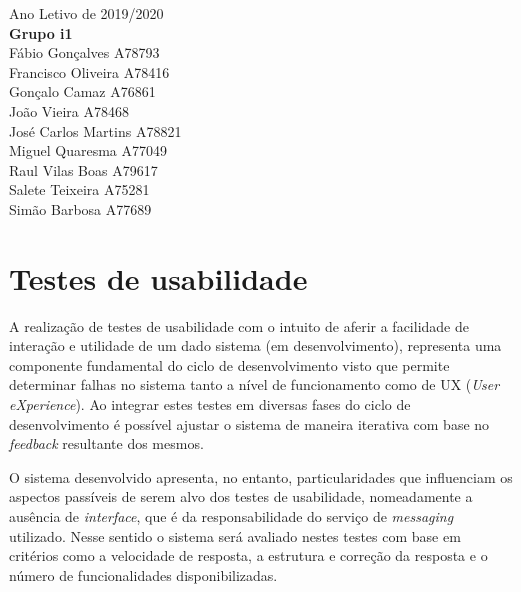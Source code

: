 \documentclass[11pt, a4paper]{article}
\begin{document}
\begin{titlepage}

{\large Ano Letivo de 2019/2020}\\ %

\vspace*{\fill}
\noindent
{\large \textbf{Grupo i1}}\\[0.5cm]
Fábio Gonçalves \textsc{A78793}\\[0.3cm]
Francisco Oliveira \textsc{A78416}\\[0.3cm]
Gonçalo Camaz \textsc{A76861}\\[0.3cm]
João Vieira \textsc{A78468}\\[0.3cm]
José Carlos Martins \textsc{A78821}\\[0.3cm]
Miguel Quaresma \textsc{A77049}\\[0.3cm]
Raul Vilas Boas \textsc{A79617}\\[0.3cm]
Salete Teixeira \textsc{A75281}\\[0.3cm]
Simão Barbosa \textsc{A77689}

\end{titlepage}

\newpage

\thispagestyle{empty}
\setcounter{page}{0}
\tableofcontents
\clearpage

\newpage

\section{Testes de usabilidade}
A realização de testes de usabilidade com o intuito de aferir a facilidade de interação e utilidade de um dado sistema (em desenvolvimento), representa uma componente fundamental do ciclo de desenvolvimento visto que permite determinar falhas no sistema tanto a nível de funcionamento como de UX (\textit{User eXperience}). Ao integrar estes testes em diversas fases do ciclo de desenvolvimento é possível ajustar o sistema de maneira iterativa com base no \textit{feedback} resultante dos mesmos.

O sistema desenvolvido apresenta, no entanto, particularidades que influenciam os aspectos passíveis de serem alvo dos testes de usabilidade, nomeadamente a ausência de \textit{interface}, que é da responsabilidade do serviço de \textit{messaging} utilizado. Nesse sentido o sistema será avaliado nestes testes com base em critérios como a velocidade de resposta, a estrutura e correção da resposta e o número de funcionalidades disponibilizadas.
\end{document}
